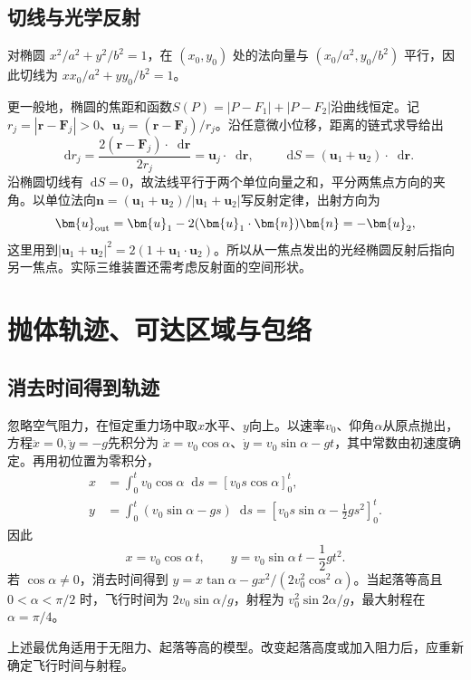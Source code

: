 \documentclass[11pt,openany,fontset=fandol]{ctexbook}
\theoremstyle{plain}\newtheorem{theorem}{定理}[chapter]\newtheorem{proposition}[theorem]{命题}
\theoremstyle{definition}\newtheorem{definition}{定义}[chapter]\newtheorem{example}{例}[chapter]
\theoremstyle{remark}\newtheorem*{remark}{说明}
\newcommand{\dd}{\mathop{}\!\mathrm d}\newcommand{\ii}{\mathrm i}\newcommand{\ee}{\mathrm e}
\newcommand{\vct}[1]{\bm{#1}}\newcommand{\Rea}{\operatorname{Re}}\newcommand{\Ima}{\operatorname{Im}}
\begin{document}
\subsection{切线与光学反射}
对椭圆 $x^2/a^2+y^2/b^2=1$，在 $(x_0,y_0)$ 处的法向量与 $(x_0/a^2,y_0/b^2)$ 平行，因此切线为 $xx_0/a^2+yy_0/b^2=1$。

更一般地，椭圆的焦距和函数$S(P)=|P-F_1|+|P-F_2|$沿曲线恒定。记$r_j=|\vct r-\vct F_j|>0$、$\vct u_j=(\vct r-\vct F_j)/r_j$。沿任意微小位移，距离的链式求导给出
\[
\dd r_j=\frac{2(\vct r-\vct F_j)\cdot\dd\vct r}{2r_j}
=\vct u_j\cdot\dd\vct r,
\qquad \dd S=(\vct u_1+\vct u_2)\cdot\dd\vct r.
\]
沿椭圆切线有$\dd S=0$，故法线平行于两个单位向量之和，平分两焦点方向的夹角。以单位法向$\vct n=(\vct u_1+\vct u_2)/|\vct u_1+\vct u_2|$写反射定律，出射方向为
\[
\vct u_{\rm out}=\vct u_1-2(\vct u_1\cdot\vct n)\vct n
=-\vct u_2,
\]
这里用到$|\vct u_1+\vct u_2|^2=2(1+\vct u_1\cdot\vct u_2)$。所以从一焦点发出的光经椭圆反射后指向另一焦点。实际三维装置还需考虑反射面的空间形状。

\section{抛体轨迹、可达区域与包络}
\subsection{消去时间得到轨迹}
忽略空气阻力，在恒定重力场中取$x$水平、$y$向上。以速率$v_0$、仰角$\alpha$从原点抛出，方程$\ddot x=0,\ddot y=-g$先积分为
$\dot x=v_0\cos\alpha$、$\dot y=v_0\sin\alpha-gt$，其中常数由初速度确定。再用初位置为零积分，
\begin{align*}
x&=\int_0^tv_0\cos\alpha\dd s=[v_0s\cos\alpha]_0^t,\\
y&=\int_0^t(v_0\sin\alpha-gs)\dd s
=\left[v_0s\sin\alpha-\frac12gs^2\right]_0^t.
\end{align*}
因此
\begin{equation}
x=v_0\cos\alpha\,t,\qquad y=v_0\sin\alpha\,t-\frac12gt^2.
\end{equation}
若 $\cos\alpha\ne0$，消去时间得到 $y=x\tan\alpha-gx^2/(2v_0^2\cos^2\alpha)$。当起落等高且 $0<\alpha<\pi/2$ 时，飞行时间为 $2v_0\sin\alpha/g$，射程为 $v_0^2\sin2\alpha/g$，最大射程在 $\alpha=\pi/4$。

上述最优角适用于无阻力、起落等高的模型。改变起落高度或加入阻力后，应重新确定飞行时间与射程。
\end{document}
